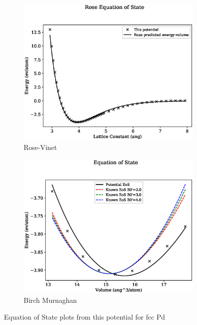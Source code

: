 \begin{figure}[htb]
\begin{subfigure}{.44\textwidth}
  \centering
  \includegraphics[width=.94\linewidth]{chapters/potentials_fe_pd_ru/fepd_potential/eos/rose_plot_bp_2.eps}  
  \caption{Rose-Vinet}
  \label{fig:fepd-fefcc-rose}
\end{subfigure}
\begin{subfigure}{.44\textwidth}
  \centering
  \includegraphics[width=.94\linewidth]{chapters/potentials_fe_pd_ru/fepd_potential/eos/equation_of_state_bp_2.eps}  
  \caption{Birch Murnaghan}
  \label{fig:fepd-fefcc-bmeos}
\end{subfigure}
\label{fig:fepd-fefcc-equation-of-state}
\caption{Equation of State plots from this potential for \acrshort{fcc} Pd}
\end{figure}


